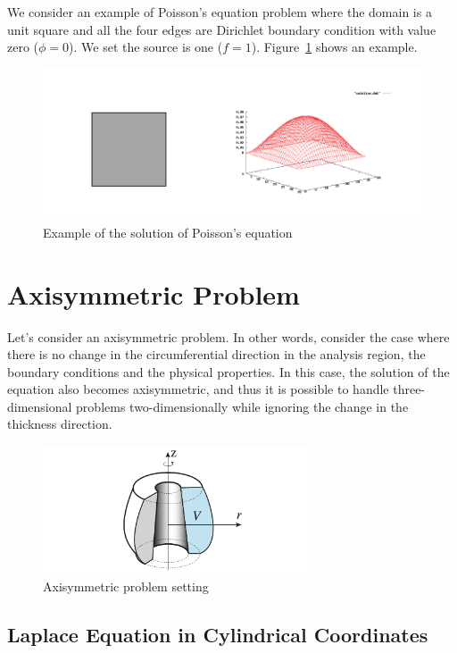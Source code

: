 We consider an example of Poisson's equation problem where the domain is a unit square and all the four edges are Dirichlet boundary condition with value zero ($\phi=0$). 
%
We set the source is one ($f=1$).
%
Figure~\ref{fig:example} shows an example.

\begin{figure}[htbp!]
\center
\includegraphics[width=150mm]{images/example}
\caption{Example of the solution of Poisson's equation}
\label{fig:example}
\end{figure}


\section{Axisymmetric Problem}
Let's consider an axisymmetric problem. 
%
In other words, consider the case where there is no change in the circumferential direction in the analysis region, the boundary conditions and the physical properties. 
%
In this case, the solution of the equation also becomes axisymmetric, and thus it is possible to handle three-dimensional problems two-dimensionally while ignoring the change in the thickness direction.

\begin{figure}[htbp!]
	\center
    \includegraphics[width=80mm]{images/cylinder_domain}
    \caption{Axisymmetric problem setting}
    \label{fig:cylinder_domain}
\end{figure}


\subsection{Laplace Equation in Cylindrical Coordinates}

